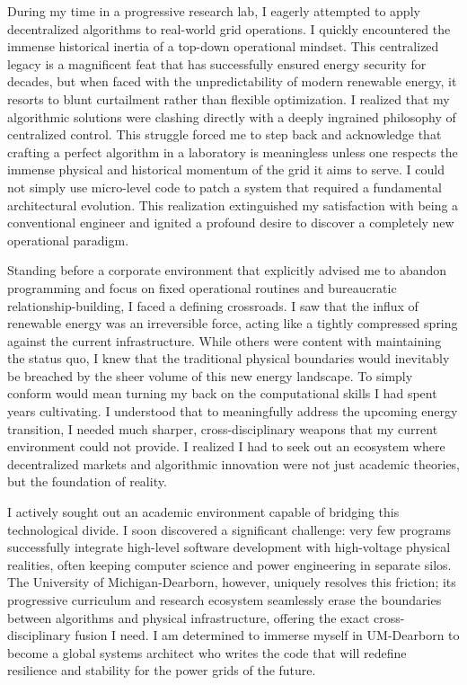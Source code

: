 \documentclass[11pt,a4paper]{article}
\begin{document}
During my time in a progressive research lab, I eagerly attempted to apply decentralized algorithms to real-world grid operations. I quickly encountered the immense historical inertia of a top-down operational mindset. This centralized legacy is a magnificent feat that has successfully ensured energy security for decades, but when faced with the unpredictability of modern renewable energy, it resorts to blunt curtailment rather than flexible optimization. I realized that my algorithmic solutions were clashing directly with a deeply ingrained philosophy of centralized control. This struggle forced me to step back and acknowledge that crafting a perfect algorithm in a laboratory is meaningless unless one respects the immense physical and historical momentum of the grid it aims to serve. I could not simply use micro-level code to patch a system that required a fundamental architectural evolution. This realization extinguished my satisfaction with being a conventional engineer and ignited a profound desire to discover a completely new operational paradigm.

Standing before a corporate environment that explicitly advised me to abandon programming and focus on fixed operational routines and bureaucratic relationship-building, I faced a defining crossroads. I saw that the influx of renewable energy was an irreversible force, acting like a tightly compressed spring against the current infrastructure. While others were content with maintaining the status quo, I knew that the traditional physical boundaries would inevitably be breached by the sheer volume of this new energy landscape. To simply conform would mean turning my back on the computational skills I had spent years cultivating. I understood that to meaningfully address the upcoming energy transition, I needed much sharper, cross-disciplinary weapons that my current environment could not provide. I realized I had to seek out an ecosystem where decentralized markets and algorithmic innovation were not just academic theories, but the foundation of reality.

I actively sought out an academic environment capable of bridging this technological divide. I soon discovered a significant challenge: very few programs successfully integrate high-level software development with high-voltage physical realities, often keeping computer science and power engineering in separate silos. The University of Michigan-Dearborn, however, uniquely resolves this friction; its progressive curriculum and research ecosystem seamlessly erase the boundaries between algorithms and physical infrastructure, offering the exact cross-disciplinary fusion I need. I am determined to immerse myself in UM-Dearborn to become a global systems architect who writes the code that will redefine resilience and stability for the power grids of the future.
\end{document}

